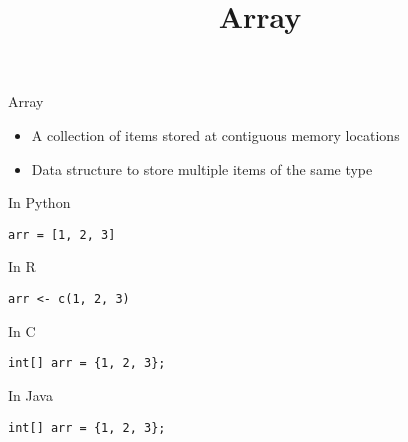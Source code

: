 \documentclass{beamer}
\title{Array}
\begin{document}
\frame{
  \titlepage
}

\begin{frame}[fragile]{Array}
  
  \begin{block}{}
    \begin{itemize}
      \item A collection of items stored at contiguous memory locations
      \item Data structure to store multiple items of the same type
    \end{itemize}
  \end{block}
  
  \begin{block}{}
    \centering
  \end{block}
  
  \begin{minipage}{0.48\textwidth}
    \begin{block}{In Python}
      \begin{lstlisting}[style=codePy]
arr = [1, 2, 3]
      \end{lstlisting}
    \end{block}
    
    \begin{block}{In R}
      \begin{lstlisting}[style=codeR]
arr <- c(1, 2, 3)
      \end{lstlisting}
    \end{block}
  
  \end{minipage}\hfill
  \begin{minipage}{0.48\textwidth}
    \begin{block}{In C}
      \begin{lstlisting}[style=codeC]
int[] arr = {1, 2, 3};
      \end{lstlisting}
    \end{block}
  
    \begin{block}{In Java}
      \begin{lstlisting}[style=codeJ]
int[] arr = {1, 2, 3};
      \end{lstlisting}
    \end{block}
  \end{minipage}
\end{frame}

\begin{frame}{}
  
  
\end{frame}
\end{document}
